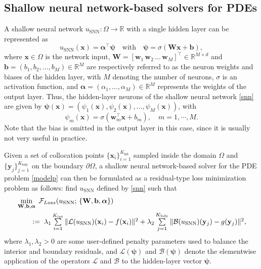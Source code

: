 \documentclass{article}
\newcommand{\bb}{\mathbf{b}}
\newcommand{\bw}{\mathbf{w}}
\newcommand{\bx}{\mathbf{x}}
\newcommand{\bW}{\mathbf{W}}
\newcommand{\cB}{\mathcal{B}}
\newcommand{\cL}{\mathcal{L}}
\newcommand{\valpha}{{\boldsymbol{\alpha}}}
\newcommand{\vpsi}{\boldsymbol{\psi}}
\newcommand{\R}{\mathbb R}
\begin{document}
\subsection{Shallow neural network-based solvers for PDEs}
A shallow neural network $u_{\mathrm{SNN}}: \Omega \rightarrow \mathbb{R}$ with a single hidden layer can be represented as
\begin{equation}\label{snn}
u_{\mathrm{SNN}}(\bx) = \valpha^\top \vpsi\quad\mbox{with}\quad  \vpsi = \sigma(\bW \bx + \bb), 
\end{equation}
where $\bx\in \Omega$ is the network input, $\bW = [\bw_1\, \bw_2\, \ldots\, \bw_M]^\top \in \R^{M\times d}$ and $\bb = (b_1, b_2, \ldots, b_M) \in \R^{M}$ are respectively referred to as the neuron weights and biases of the hidden layer, with $M$ denoting the number of neurons, $\sigma$ is an activation function, and $\valpha = (\alpha_1, \ldots, \alpha_M) \in \R^{M}$ represents the weights of the output layer. Thus, the hidden-layer neurons of the shallow neural network \eqref{snn} are given by $\vpsi(\bx) = (\psi_1(\bx), \psi_2(\bx), \ldots, \psi_M(\bx))$, with
\begin{equation}\label{eq:psi}
\psi_m(\bx) = \sigma(\mathbf{w}_m^\top \bx + b_m), \quad m = 1,\cdots, M.
\end{equation}
Note that the bias is omitted in the output layer in this case, since it is usually not very useful in practice.

Given a set of collocation points $\{\bx_{i}\}_{i=1}^{K_{\text{int}}}$ sampled inside the domain $\Omega$ and $\{\mathbf{y}_{j}\}_{j=1}^{K_{\text{bdy}}}$ on the  boundary $\partial \Omega$, a shallow neural network-based solver for the PDE problem \eqref{modelp} can then be formulated as a residual-type loss minimization problem as follows:  find $u_{\mathrm{SNN}}$ defined by \eqref{snn} such that
\begin{equation}\label{eq:optim_SN-o}
\begin{aligned}
&\min_{\bW,\bb,\valpha} \;{\cal F}_{Loss}(u_{\mathrm{SNN}};\,\{\bW,\bb,\valpha\}) \\
&\qquad := \textstyle \;\lambda_1\sum\limits_{i=1}^{K_{\text{int}}} \|\cL(u_{\mathrm{SNN}})(\bx_i)-f(\bx_i)\|^2 
+ \lambda_2 \sum\limits_{j=1}^{K_{\text{bdy}}} \|\cB(u_{\mathrm{SNN}})(\mathbf{y}_j)-g(\mathbf{y}_j)\|^2,
\end{aligned}
\end{equation}
where $\lambda_1,\lambda_2>0$ are some user-defined penalty parameters used  to balance the interior and boundary residuals, and $\cL(\vpsi)$ and $\cB(\vpsi)$ denote the elementwise application of the operators $\cL$ and $\cB$ to the hidden-layer vector $\vpsi$. 
\end{document}
